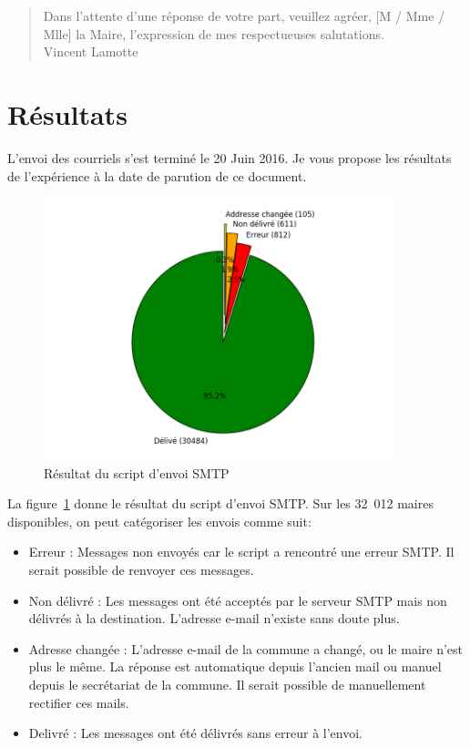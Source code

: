 \documentclass{article}
\begin{document}
\begin{framed}
\begin{quotation}
Dans l’attente d’une réponse de votre part, veuillez agréer, [M / Mme / Mlle] la Maire, l'expression de mes respectueuses salutations.\\

Vincent Lamotte
\end{quotation}
\end{framed}

\section{Résultats}
L'envoi des courriels s'est terminé le 20 Juin 2016. Je vous propose les résultats de l'expérience à la date de parution de ce document.

\begin{figure}[h]
    \centering
    \includegraphics[width=4in]{send.png}
    \caption{Résultat du script d'envoi SMTP}
    \label{send}
\end{figure}

La figure~\ref{send} donne le résultat du script d'envoi SMTP. Sur les 32~012 maires disponibles, on peut catégoriser les envois comme suit:
\begin{itemize}
\item Erreur : Messages non envoyés car le script a rencontré une erreur SMTP. Il serait possible de renvoyer ces messages.
\item Non délivré : Les messages ont été acceptés par le serveur SMTP mais non délivrés à la destination. L'adresse e-mail n'existe sans doute plus.
\item Adresse changée : L'adresse e-mail de la commune a changé, ou le maire n'est plus le même. La réponse est automatique depuis l'ancien mail ou manuel depuis le secrétariat de la commune. Il serait possible de manuellement rectifier ces mails.
\item Delivré : Les messages ont été délivrés sans erreur à l'envoi.
\end{itemize}
\end{document}
